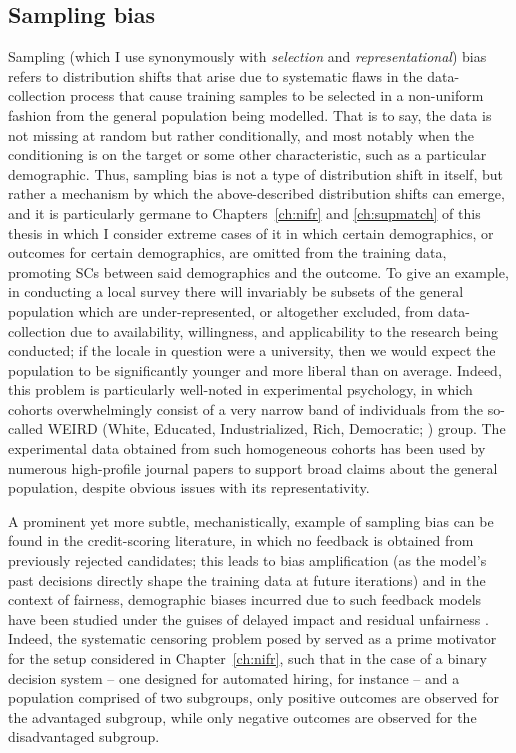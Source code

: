 \subsection{Sampling bias}\label{ssec:sampling-bias}
Sampling (which I use synonymously with \emph{selection} and \emph{representational}) bias refers
to distribution shifts that arise due to systematic flaws in the data-collection process that cause
training samples to be selected in a non-uniform fashion from the general population being
modelled.
%
That is to say, the data is not missing at random but rather conditionally, and most notably when
the conditioning is on the target or some other characteristic, such as a particular demographic.
%
Thus, sampling bias is not a type of distribution shift in itself, but rather a mechanism by which
the above-described distribution shifts can emerge, and it is particularly germane to
Chapters~\ref{ch:nifr} and \ref{ch:supmatch} of this thesis in which I consider extreme cases of it
in which certain demographics, or outcomes for certain demographics, are omitted from the training
data, promoting \acp{SC} between said demographics and the outcome.
%
To give an example, in conducting a local survey there will invariably be subsets of the general
population which are under-represented, or altogether excluded, from data-collection due to
availability, willingness, and applicability to the research being conducted; if the locale in
question were a university, then we would expect the population to be significantly younger and
more liberal than on average.
%
Indeed, this problem is particularly well-noted in experimental psychology, in which cohorts
overwhelmingly consist of a very narrow band of individuals from the so-called WEIRD (White,
Educated, Industrialized, Rich, Democratic; \citet{henrich2010weirdest}) group.
%
The experimental data obtained from such homogeneous cohorts has been used by numerous high-profile
journal papers to support broad claims about the general population, despite obvious issues with
its representativity.

%
A prominent yet more subtle, mechanistically, example of sampling bias can be found in the
credit-scoring literature, in which no feedback is obtained from previously rejected candidates;
this leads to bias amplification (as the model's past decisions directly shape the training data at
future iterations) and in the context of fairness, demographic biases incurred due to such feedback
models have been studied under the guises of delayed impact \citep{liu2018delayed} and residual
unfairness \citep{kallus2018residual}.
%
Indeed, the systematic censoring problem posed by \citet{kallus2018residual} served as a prime
motivator for the setup considered in Chapter~\ref{ch:nifr}, such that in the case of a binary
decision system -- one designed for automated hiring, for instance -- and a population comprised of
two subgroups, only positive outcomes are observed for the advantaged subgroup, while only negative
outcomes are observed for the disadvantaged subgroup.
%
